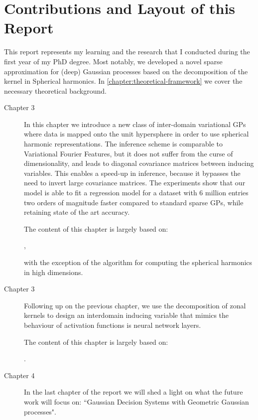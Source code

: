 


\section{Contributions and Layout of this Report}

This report represents my learning and the research that I conducted during the first year of my PhD degree. Most notably, we developed a novel sparse approximation for (deep) Gaussian processes based on the decomposition of the kernel in Spherical harmonics. In \cref{chapter:theoretical-framework} we cover the necessary theoretical background.

\begin{description}
    \item[Chapter 3] In this chapter we introduce a new class of inter-domain variational GPs where data is mapped onto the unit hypersphere in order to use spherical harmonic representations. The inference scheme is comparable to Variational Fourier Features, but it does not suffer from the curse of dimensionality, and leads to diagonal covariance matrices between inducing variables. This enables a speed-up in inference, because it bypasses the need to invert large covariance matrices. The experiments show that our model is able to fit a regression model for a dataset with 6 million entries two orders of magnitude faster compared to standard sparse GPs, while retaining state of the art accuracy.
    
    The content of this chapter is largely based on:

    ,

    with the exception of the algorithm for computing the spherical harmonics in high dimensions.

    \item[Chapter 3] Following up on the previous chapter, we use the decomposition of zonal kernels to design an interdomain inducing variable that mimics the behaviour of activation functions is neural network layers. 

    The content of this chapter is largely based on:

    .

    \item[Chapter 4] In the last chapter of the report we will shed a light on what the future work will focus on: ``Gaussian Decision Systems with Geometric Gaussian processes".
\end{description}
